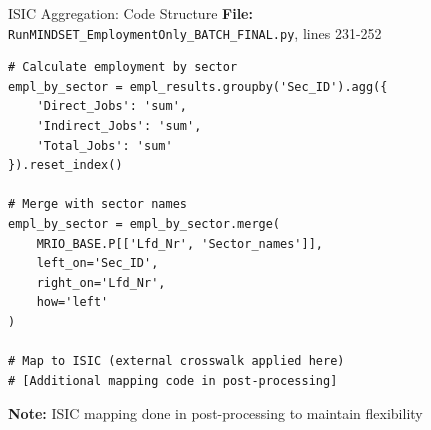 \documentclass[10pt]{beamer}
\begin{document}
\begin{frame}[fragile]{ISIC Aggregation: Code Structure}
\textbf{File:} \texttt{RunMINDSET\_EmploymentOnly\_BATCH\_FINAL.py}, lines 231-252

\vspace{0.2cm}

\begin{verbatim}
# Calculate employment by sector
empl_by_sector = empl_results.groupby('Sec_ID').agg({
    'Direct_Jobs': 'sum',
    'Indirect_Jobs': 'sum',
    'Total_Jobs': 'sum'
}).reset_index()

# Merge with sector names
empl_by_sector = empl_by_sector.merge(
    MRIO_BASE.P[['Lfd_Nr', 'Sector_names']],
    left_on='Sec_ID',
    right_on='Lfd_Nr',
    how='left'
)

# Map to ISIC (external crosswalk applied here)
# [Additional mapping code in post-processing]
\end{verbatim}

\vspace{0.3cm}

\textbf{Note:} ISIC mapping done in post-processing to maintain flexibility

\end{frame}
\end{document}
